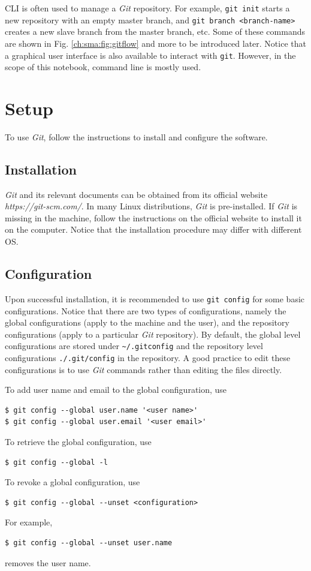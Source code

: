 CLI is often used to manage a \textit{Git} repository. For example, \verb|git init| starts a new repository with an empty master branch, and \verb|git branch <branch-name>| creates a new slave branch from the master branch, etc. Some of these commands are shown in Fig. \ref{ch:sma:fig:gitflow} and more to be introduced later. Notice that a graphical user interface is also available to interact with \verb|git|. However, in the scope of this notebook, command line is mostly used.

\section{Setup}

To use \textit{Git}, follow the instructions to install and configure the software.

\subsection{Installation}

\textit{Git} and its relevant documents can be obtained from its official website \textit{https://git-scm.com/}. In many Linux distributions, \textit{Git} is pre-installed. If \textit{Git} is missing in the machine, follow the instructions on the official website to install it on the computer. Notice that the installation procedure may differ with different OS.

\subsection{Configuration}

Upon successful installation, it is recommended to use \verb|git config| for some basic configurations. Notice that there are two types of configurations, namely the global configurations (apply to the machine and the user), and the repository configurations (apply to a particular \textit{Git} repository). By default, the global level configurations are stored under \verb|~/.gitconfig| and the repository level configurations \verb|./.git/config| in the repository. A good practice to edit these configurations is to use \textit{Git} commands rather than editing the files directly.

To add user name and email to the global configuration, use
\begin{lstlisting}
$ git config --global user.name '<user name>'
$ git config --global user.email '<user email>'
\end{lstlisting}
To retrieve the global configuration, use
\begin{lstlisting}
$ git config --global -l
\end{lstlisting}
To revoke a global configuration, use
\begin{lstlisting}
$ git config --global --unset <configuration>
\end{lstlisting}
For example,
\begin{lstlisting}
$ git config --global --unset user.name
\end{lstlisting}
removes the user name.

